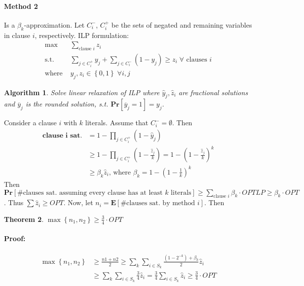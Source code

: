 \documentclass[12pt]{article}
\newtheorem{thm}{Theorem}[section]
\newtheorem{alg}[thm]{Algorithm}
\begin{document}
\paragraph{Method 2} Is a $\beta_k$-approximation. Let $C_i^-$, $C_i^+$ be the sets of negated and remaining variables in clause $i$, respectively. ILP formulation:
\begin{align*}
\max & \sum_{\text{clause } i} z_i\\
\text{s.t. }& \sum_{j \in C^+_i} y_j + \sum_{j \in C_i^-}(1-y_j) \geq z_i \; \forall \text{ clauses } i \\
\text{where }& y_j,z_i \in \left\{ 0,1 \right\} \; \forall i,j
\end{align*}

\begin{alg}
Solve linear relaxation of ILP where $\hat{y}_j, \hat{z}_i$ are fractional solutions and $\overline{y}_j$ is the rounded solution, s.t. $\mathbf{Pr}[\overline{y}_j = 1] = \hat{y}_j$. \\
\end{alg}

Consider a clause $i$ with $k$ literals. Assume that $C_i^- = \emptyset$. Then
\begin{align*}
\mathbf{\text{clause } i \text{ sat.}} &=1-\prod_{j \in C_i^+}(1-\hat{y}_j) \\
&\geq 1-\prod_{j \in C_i^+}\left(1-\frac{\hat{z}_j}{k}\right)=1-\left(1-\frac{\hat{z}_j}{k}\right)^k \\
&\geq\beta_k\hat{z}_i\text{, where } \beta_k=1-\left(1-\frac{1}{k}\right)^k
\end{align*}
Then $\mathbf{Pr}[\text{\# clauses sat. assuming every clause has at least } k \text{ literals}] \geq \sum_{\text{clause } i}\beta_k \cdot OPTLP \geq \beta_k \cdot OPT$. Thus $\sum \hat{z}_i \geq OPT$. Now, let $n_i = \mathbf{E}[\text{\# clauses sat. by method } i]$. Then \\
\begin{thm}
$\max \left\{ n_1, n_2 \right\} \geq \frac{3}{4} \cdot OPT$
\paragraph{Proof:}
\begin{align*}
\max \left\{ n_1, n_2 \right\} &\geq \frac{n1+n2}{2} \geq \sum_k \sum_{i \in S_k} \frac{(1-2^{-k}) + \beta_k}{2} \hat{z}_i \\
&\geq \sum_k \sum_{i \in S_k} \frac{3}{4} \hat{z}_i = \frac{3}{4} \sum_{i \in S_k}  \hat{z}_i \geq \frac{3}{4} \cdot OPT
\end{align*}
\end{thm}
\end{document}
